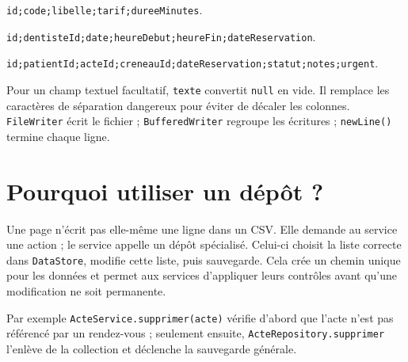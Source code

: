 \documentclass[11pt,a4paper]{report}
\begin{document}
\begin{description}[leftmargin=3.6cm,style=nextline]
\item[Acte] \texttt{id;code;libelle;tarif;dureeMinutes}.
\item[Créneau] \texttt{id;dentisteId;date;heureDebut;heureFin;dateReservation}.
\item[Rendez-vous] \texttt{id;patientId;acteId;creneauId;dateReservation;statut;notes;urgent}.
\end{description}
Pour un champ textuel facultatif, \texttt{texte} convertit \texttt{null} en vide. Il remplace les caractères de séparation dangereux pour éviter de décaler les colonnes. \texttt{FileWriter} écrit le fichier ; \texttt{BufferedWriter} regroupe les écritures ; \texttt{newLine()} termine chaque ligne.

\section{Pourquoi utiliser un dépôt ?}
Une page n'écrit pas elle-même une ligne dans un CSV. Elle demande au service une action ; le service appelle un dépôt spécialisé. Celui-ci choisit la liste correcte dans \texttt{DataStore}, modifie cette liste, puis sauvegarde. Cela crée un chemin unique pour les données et permet aux services d'appliquer leurs contrôles avant qu'une modification ne soit permanente.

Par exemple \texttt{ActeService.supprimer(acte)} vérifie d'abord que l'acte n'est pas référencé par un rendez-vous ; seulement ensuite, \texttt{ActeRepository.supprimer} l'enlève de la collection et déclenche la sauvegarde générale.
\end{document}

